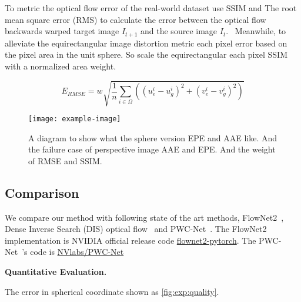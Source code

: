 To metric the optical flow error of the real-world dataset use SSIM and The root mean square error (RMS) to calculate the error between the optical flow backwards warped target image $I_{t+1}$ and the source image $I_t$.~\cite{??}
Meanwhile, to alleviate the equirectangular image distortion metric each pixel error based on the pixel area in the unit sphere.
So scale the equirectangular each pixel SSIM with a normalized area weight.

\begin{equation}\label{equ:exp:rmsesph}
	E_{RMSE} = w_{} \sqrt{\frac{1}{n} \sum_{i \in \Omega}((u_e^i - u_g^i)^2 + (v_e^i - v_g^i)^2)}
\end{equation}

\begin{figure}[hbt!]
	\centering
	\texttt{[image: example-image]}
	\caption{A diagram to show what the sphere version EPE and AAE like. And the failure case of perspective image AAE and EPE. And the weight of RMSE and SSIM.}
	\label{fig:exp:errormetric}
\end{figure}

\subsection{Comparison}

We compare our method with following state of the art methods, FlowNet2~\cite{IlgMSKDB2017}, Dense Inverse Search (DIS) optical flow~\cite{KroegTDV2016} and PWC-Net~\cite{SunYLK2018}. 
The FlowNet2~\cite{IlgMSKDB2017} implementation is NVIDIA official release code \href{https://github.com/NVIDIA/flownet2-pytorch}{flownet2-pytorch}.
The PWC-Net~\cite{SunYLK2018}'s code is \href{https://github.com/NVlabs/PWC-Net}{NVlabs/PWC-Net}

\textbf{Quantitative Evaluation.}

The error in spherical coordinate shown as \cref{fig:exp:quality}.



